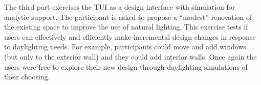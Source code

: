 \documentclass{article}
\begin{document}

The third part exercises the TUI as a design interface with
simulation for analytic support.  The participant is asked to propose
a ``modest'' renovation of the existing space to improve the use of
natural lighting.  This exercise tests if users can effectively and
efficiently make incremental design changes in response to daylighting
needs.  
For example, participants could move
and add windows (but only to the exterior wall) and they could add
interior walls.  Once again the users were free to explore their new
design through daylighting simulations of their choosing.  
%
\end{document}

